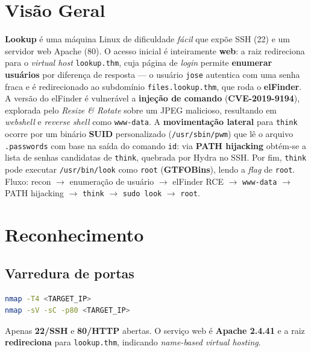 \documentclass[12pt,a4paper]{article}
\begin{document}
\section{Visão Geral}
\textbf{Lookup} é uma máquina Linux de dificuldade \emph{fácil} que expõe SSH (22)
e um servidor web Apache (80). O acesso inicial é inteiramente \textbf{web}: a
raiz redireciona para o \emph{virtual host} \texttt{lookup.thm}, cuja página de
\emph{login} permite \textbf{enumerar usuários} por diferença de resposta --- o
usuário \texttt{jose} autentica com uma senha fraca e é redirecionado ao
subdomínio \texttt{files.lookup.thm}, que roda o \textbf{elFinder}. A versão do
elFinder é vulnerável a \textbf{injeção de comando} (\textbf{CVE-2019-9194}),
explorada pelo \emph{Resize \& Rotate} sobre um JPEG malicioso, resultando em
\emph{webshell} e \emph{reverse shell} como \texttt{www-data}. A
\textbf{movimentação lateral} para \texttt{think} ocorre por um binário
\textbf{SUID} personalizado (\texttt{/usr/sbin/pwm}) que lê o arquivo
\texttt{.passwords} com base na saída do comando \texttt{id}: via \textbf{PATH
hijacking} obtém-se a lista de senhas candidatas de \texttt{think}, quebrada por
Hydra no SSH. Por fim, \texttt{think} pode executar \texttt{/usr/bin/look} como
\texttt{root} (\textbf{GTFOBins}), lendo a \emph{flag} de \texttt{root}. Fluxo:
recon $\rightarrow$ enumeração de usuário $\rightarrow$ elFinder RCE
$\rightarrow$ \texttt{www-data} $\rightarrow$ PATH hijacking $\rightarrow$
\texttt{think} $\rightarrow$ \texttt{sudo look} $\rightarrow$ \texttt{root}.

\section{Reconhecimento}

\subsection{Varredura de portas}
\begin{lstlisting}[language=bash,caption={Varredura de portas e serviço web com Nmap.}]
nmap -T4 <TARGET_IP>
nmap -sV -sC -p80 <TARGET_IP>
\end{lstlisting}

Apenas \textbf{22/SSH} e \textbf{80/HTTP} abertas. O serviço web é
\textbf{Apache 2.4.41} e a raiz \textbf{redireciona} para \texttt{lookup.thm},
indicando \emph{name-based virtual hosting}.
\end{document}
